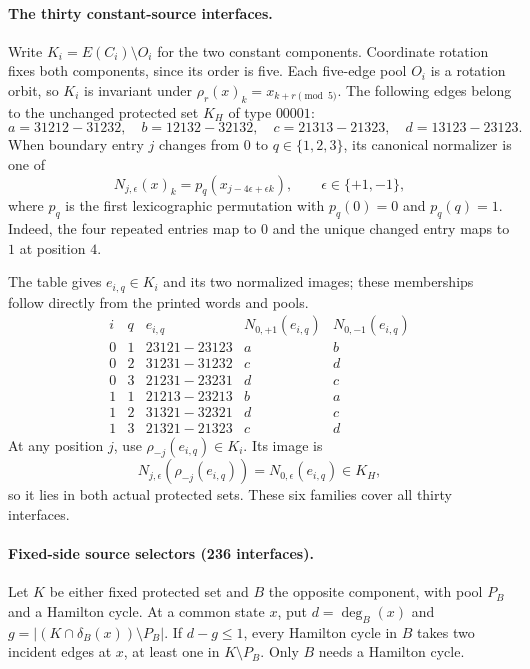 \documentclass[11pt]{article}
\numberwithin{equation}{section}
\numberwithin{table}{section}
\begin{document}
\paragraph{The thirty constant-source interfaces.}
Write $K_i=E(C_i)\setminus O_i$ for the two constant components.
Coordinate rotation fixes both components, since its order is five.
Each five-edge pool $O_i$ is a rotation orbit, so $K_i$ is invariant
under $\rho_r(x)_k=x_{k+r\pmod5}$. The following edges belong to
the unchanged protected set $K_H$ of type $00001$:
\[
a=31212\!-31232,\quad b=12132\!-32132,\quad
c=21313\!-21323,\quad d=13123\!-23123.
\]
When boundary entry $j$ changes from $0$ to $q\in\{1,2,3\}$,
its canonical normalizer is one of
\[
 N_{j,\epsilon}(x)_k=p_q(x_{j-4\epsilon+\epsilon k}),
 \qquad \epsilon\in\{+1,-1\},
\]
where $p_q$ is the first lexicographic permutation with $p_q(0)=0$
and $p_q(q)=1$. Indeed, the four repeated entries map to $0$ and
the unique changed entry maps to $1$ at position $4$.
\par{}
The table gives $e_{i,q}\in K_i$ and its two normalized images;
these memberships follow directly from the printed words and pools.
\[
\begin{array}{cc|c|cc}
i&q&e_{i,q}&N_{0,+1}(e_{i,q})&N_{0,-1}(e_{i,q})\\ \hline
0&1&23121\!-23123&a&b\\
0&2&31231\!-31232&c&d\\
0&3&21231\!-23231&d&c\\
1&1&21213\!-23213&b&a\\
1&2&31321\!-32321&d&c\\
1&3&21321\!-21323&c&d
\end{array}
\]
At any position $j$, use $\rho_{-j}(e_{i,q})\in K_i$. Its image is
\[
 N_{j,\epsilon}(\rho_{-j}(e_{i,q}))
      =N_{0,\epsilon}(e_{i,q})\in K_H,
\]
so it lies in both actual protected sets. These six families cover
all thirty interfaces.

\paragraph{Fixed-side source selectors (236 interfaces).}
Let $K$ be either fixed protected set and $B$ the opposite component,
with pool $P_B$ and a Hamilton cycle. At a common state $x$, put
$d=\deg_B(x)$ and $g=|(K\cap\delta_B(x))\setminus P_B|$.
If $d-g\le1$, every Hamilton cycle in $B$ takes two incident edges
at $x$, at least one in $K\setminus P_B$. Only $B$ needs a Hamilton cycle.
\end{document}
